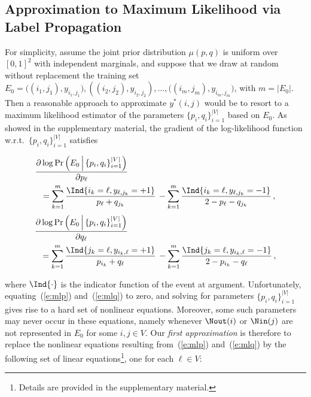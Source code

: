 
\subsection{Approximation to Maximum Likelihood via Label Propagation}\label{ss:passive}

For simplicity, assume the joint prior distribution $\mu(p,q)$ is uniform over $[0,1]^2$ with independent marginals, and suppose that we draw at random without replacement the training set $E_0 = \big((i_1,j_1),y_{i_1,j_1}), ((i_2,j_2),y_{i_2,j_2}), \ldots, ((i_m,j_m),y_{i_m,j_m}\big)$, with $m = |E_0|$. Then a reasonable approach to approximate $y^*(i,j)$ would be to resort to a maximum likelihood estimator of the parameters $\{p_i, q_i\}_{i=1}^{|V|}$ based on $E_0$.
As showed in the supplementary material,
the gradient of the log-likelihood function w.r.t.\ $\{p_i, q_i\}_{i=1}^{|V|}$ satisfies
%
%
\begin{small}
\begin{align}
&\frac{\partial \log \Pr\left(E_0 \,\Big|\, \{p_i, q_i\}_{i=1}^{|V|}\right)}{\partial p_{\ell}}\label{e:mlp}\\
&\ \ = 
\sum_{k=1}^m
\frac{\Ind{i_k = \ell,y_{\ell,j_k}=+1}}{p_{\ell}+q_{j_k}}\, 
- \sum_{k=1}^m
\frac{\Ind{i_k = \ell,y_{\ell,j_k}=-1}}{2-p_{\ell}-q_{j_k}}\,,\notag
\end{align}
%
\begin{align}
&\frac{\partial \log \Pr\left(E_0 \,\Big|\, \{p_i, q_i\}_{i=1}^{|V|}\right)}{\partial q_{\ell}}\label{e:mlq}\\
&\ \ = 
\sum_{k=1}^m
\frac{\Ind{j_k = \ell,y_{i_k,\ell}=+1}}{p_{i_k}+q_{\ell}}\, 
- \sum_{k=1}^m
\frac{\Ind{j_k = \ell,y_{i_k,\ell}=-1}}{2-p_{i_k}-q_{\ell}}\,,\notag
\end{align}
\end{small}
%
where $\Ind{\cdot}$ is the indicator function of the event at argument.
Unfortunately, equating~(\ref{e:mlp}) and~(\ref{e:mlq}) to zero, and solving for parameters $\{p_i, q_i\}_{i=1}^{|V|}$ gives rise to a hard set of nonlinear equations.
Moreover, some such parameters may never occur in these equations, namely whenever $\Nout(i)$ or $\Nin(j)$ are not represented in $E_0$ for some $i,j\in V$. 
%
Our \emph{first approximation} is therefore to replace the nonlinear equations resulting from~(\ref{e:mlp}) and~(\ref{e:mlq}) by the following set of linear equations\footnote{Details are provided in the supplementary material.}, one for each $\ell \in V$:
